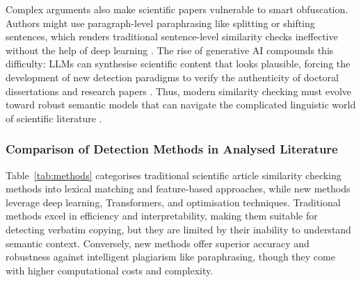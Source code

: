 \documentclass[12pt, a4paper]{article}
\begin{document}
Complex arguments also make scientific papers vulnerable to smart obfuscation. Authors might use paragraph-level paraphrasing like splitting or shifting sentences, which renders traditional sentence-level similarity checks ineffective without the help of deep learning \citep{Saqaabi2025}. The rise of generative AI compounds this difficulty: LLMs can synthesise scientific content that looks plausible, forcing the development of new detection paradigms to verify the authenticity of doctoral dissertations and research papers \citep{Alhijawi2025, Murch2025}. Thus, modern similarity checking must evolve toward robust semantic models that can navigate the complicated linguistic world of scientific literature \citep{GreinerPetter2025}.

\subsubsection{Comparison of Detection Methods in Analysed Literature}

Table~\ref{tab:methods} categorises traditional scientific article similarity checking methods into lexical matching and feature-based approaches, while new methods leverage deep learning, Transformers, and optimisation techniques. Traditional methods excel in efficiency and interpretability, making them suitable for detecting verbatim copying, but they are limited by their inability to understand semantic context. Conversely, new methods offer superior accuracy and robustness against intelligent plagiarism like paraphrasing, though they come with higher computational costs and complexity.
\end{document}
